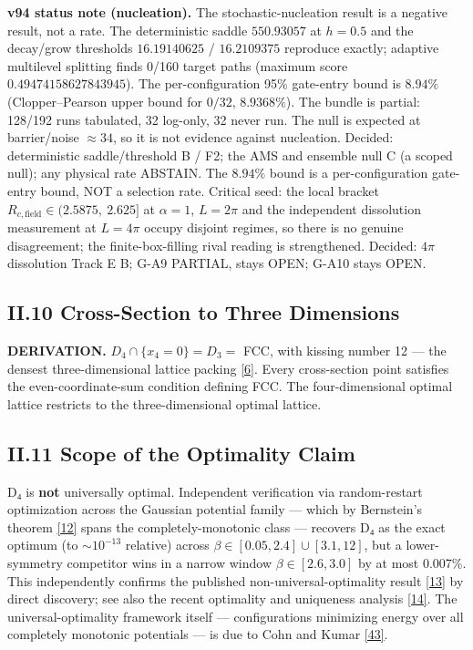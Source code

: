 \documentclass[a4paper,11pt]{article}
\begin{document}
\textbf{v94 status note (nucleation).} The stochastic-nucleation result is a negative result, not a rate. The deterministic saddle $550.93057$ at $h=0.5$ and the decay/grow thresholds $16.19140625$ / $16.2109375$ reproduce exactly; adaptive multilevel splitting finds 0/160 target paths (maximum score $0.49474158627843945$). The per-configuration 95\% gate-entry bound is $8.94\%$ (Clopper--Pearson upper bound for $0/32$, $8.9368\%$). The bundle is partial: 128/192 runs tabulated, 32 log-only, 32 never run. The null is expected at barrier/noise $\approx34$, so it is not evidence against nucleation. Decided: deterministic saddle/threshold B / F2; the AMS and ensemble null C (a scoped null); any physical rate ABSTAIN. The $8.94\%$ bound is a per-configuration gate-entry bound, NOT a selection rate. Critical seed: the local bracket $R_{c,\mathrm{field}}\in(2.5875,\ 2.625]$ at $\alpha=1$, $L=2\pi$ and the independent dissolution measurement at $L=4\pi$ occupy disjoint regimes, so there is no genuine disagreement; the finite-box-filling rival reading is strengthened. Decided: $4\pi$ dissolution Track E B; G-A9 PARTIAL, stays OPEN; G-A10 stays OPEN.

\subsection*{II.10 Cross-Section to Three Dimensions}

\textbf{DERIVATION.} $D_4\cap\{x_4=0\}=D_3=$ FCC, with kissing number 12 — the densest three-dimensional lattice packing \hyperref[ref6]{[6]}. Every cross-section point satisfies the even-coordinate-sum condition defining FCC. The four-dimensional optimal lattice restricts to the three-dimensional optimal lattice.

\subsection*{II.11 Scope of the Optimality Claim}

D₄ is \textbf{not} universally optimal. Independent verification via random-restart optimization across the Gaussian potential family — which by Bernstein's theorem \hyperref[ref12]{[12]} spans the completely-monotonic class — recovers D₄ as the exact optimum (to $\sim10^{-13}$ relative) across $\beta\in[0.05,2.4]\cup[3.1,12]$, but a lower-symmetry competitor wins in a narrow window $\beta\in[2.6,3.0]$ by at most 0.007\%. This independently confirms the published non-universal-optimality result \hyperref[ref13]{[13]} by direct discovery; see also the recent optimality and uniqueness analysis \hyperref[ref14]{[14]}. The universal-optimality framework itself — configurations minimizing energy over all completely monotonic potentials — is due to Cohn and Kumar \hyperref[ref43]{[43]}.
\end{document}
